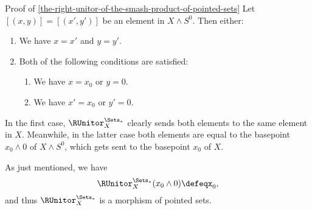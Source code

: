 \begin{Proof}{Proof of \cref{the-right-unitor-of-the-smash-product-of-pointed-sets}}%
    Let $[(x,y)]=[(x',y')]$ be an element in $X\wedge S^{0}$. Then either:
    \begin{enumerate}
        \item\label{proof-of-the-right-unitor-of-the-smash-product-of-pointed-sets-1}We have $x=x'$ and $y=y'$.
        \item\label{proof-of-the-right-unitor-of-the-smash-product-of-pointed-sets-2}Both of the following conditions are satisfied:
            \begin{enumerate}
                \item\label{proof-of-the-right-unitor-of-the-smash-product-of-pointed-sets-2-a}We have $x=x_{0}$ or $y=0$.
                \item\label{proof-of-the-right-unitor-of-the-smash-product-of-pointed-sets-2-b}We have $x'=x_{0}$ or $y'=0$.
            \end{enumerate}
    \end{enumerate}
    In the first case, $\RUnitor^{\Sets_{*}}_{X}$ clearly sends both elements to the same element in $X$. Meanwhile, in the latter case both elements are equal to the basepoint $x_{0}\wedge 0$ of $X\wedge S^{0}$, which gets sent to the basepoint $x_{0}$ of $X$.

    As just mentioned, we have
    \[
        \RUnitor^{\Sets_{*}}_{X}(x_{0}\wedge 0)%
        \defeq%
        x_{0},%
    \]%
    and thus $\RUnitor^{\Sets_{*}}_{X}$ is a morphism of pointed sets.


\end{Proof}
